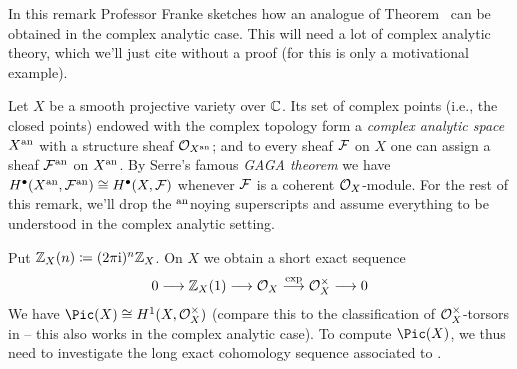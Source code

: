 \documentclass[a4paper,parskip=half,numbers=enddot, DIV=12]{scrreprt}
\begin{document}
\begin{rem}
	In this remark Professor Franke sketches how an analogue of Theorem~ can be obtained in the complex analytic case. This will need a lot of complex analytic theory, which we'll just cite without a proof (for this is only a motivational example).
	
	Let $X$ be a smooth projective variety over $\mathbb{C}$. Its set of complex points (i.e., the closed points) endowed with the complex topology form a \emph{complex analytic space} $X^{\mathrm{an}}$ with a structure sheaf $\mathcal{O}_{X^{\mathrm{an}}}$; and to every sheaf $\mathcal{F}$ on $X$ one can assign a sheaf $\mathcal{F}^{\mathrm{an}}$ on $X^{\mathrm{an}}$. By Serre's famous \emph{GAGA theorem} we have $H^\bullet(X^{\mathrm{an}},\mathcal{F}^{\mathrm{an}})\cong H^\bullet(X,\mathcal{F})$ whenever $\mathcal{F}$ is a coherent $\mathcal{O}_X$-module. For the rest of this remark, we'll drop the  $^{\mathrm{an}}$noying superscripts and assume everything to be understood in the complex analytic setting.
	
	Put $\mathbb{Z}_X(n)\coloneqq (2\pi\mathrm{i})^n\mathbb{Z}_X$. On $X$ we obtain a short exact sequence
	\begin{align}\lbl{eq:ComplexSeq}
		0\morphism \IZ_X(1)\morphism\Oo_X\morphism[\exp]\Oo_X^\times\morphism 0
	\end{align}
	We have $\Pic(X)\cong H^1(X,\Oo_X^\times)$ (compare this to the classification of $\mathcal{O}_X^\times$-torsors in \cite[Section~1.7]{alggeo2} -- this also works in the complex analytic case). To compute $\Pic(X)$, we thus need to investigate the long exact cohomology sequence associated to .
	

\end{rem}
\end{document}
